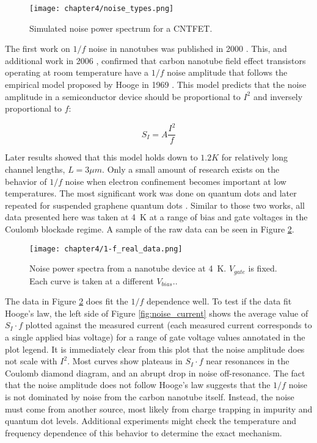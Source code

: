 \begin{figure}
    \centering
    \texttt{[image: chapter4/noise\_types.png]}
    \caption{Simulated noise power spectrum for a CNTFET.}
    \label{fig:simulated_noise}
\end{figure}

The first work on $1/f$ noise in nanotubes was published in 2000 \cite{Collins2000}. This, and additional work in 2006 \cite{Ishigami2006}, confirmed that carbon nanotube field effect transistors operating at room temperature have a $1/f$ noise amplitude that follows the empirical model proposed by Hooge in 1969 \cite{Hooge1969}. This model predicts that the noise amplitude in a semiconductor device should be proportional to $I^2$ and inversely proportional to $f$:

\begin{equation}
    \label{eq:hooge}
    S_{I} = A\frac{I^2}{f}
\end{equation}

Later results \cite{Tobias2008} showed that this model holds down to $1.2K$ for relatively long channel lengths, $L=3\mu m$. Only a small amount of research exists on the behavior of $1/f$ noise when electron confinement becomes important at low temperatures. The most significant work was done on  quantum dots \cite{Jung2004} and later repeated for suspended graphene quantum dots \cite{Song2015}. Similar to those two works, all data presented here was taken at \SI{4}{\kelvin} at a range of bias and gate voltages in the Coulomb blockade regime. A sample of the raw data can be seen in Figure \ref{fig:1-f_data}.

\begin{figure}
    \centering
    \texttt{[image: chapter4/1-f\_real\_data.png]}
    \caption{Noise power spectra from a nanotube device at \SI{4}{\kelvin}. $V_{gate}$ is fixed. Each curve is taken at a different $V_{bias}.$.}
    \label{fig:1-f_data}
\end{figure}

The data in Figure \ref{fig:1-f_data} does fit the $1/f$ dependence well. To test if the data fit Hooge's law, the left side of Figure \ref{fig:noise_current} shows the average value of $S_I \cdot f$ plotted against the measured current (each measured current corresponds to a single applied bias voltage) for a range of gate voltage values annotated in the plot legend. It is immediately clear from this plot that the noise amplitude does not scale with $I^2$. Most curves show plateaus in $S_I \cdot f$ near resonances in the Coulomb diamond diagram, and an abrupt drop in noise off-resonance. The fact that the noise amplitude does not follow Hooge's law suggests that the $1/f$ noise is not dominated by noise from the carbon nanotube itself. Instead, the noise must come from another source, most likely from charge trapping in impurity and quantum dot levels. Additional experiments might check the temperature and frequency dependence of this behavior to determine the exact mechanism.

